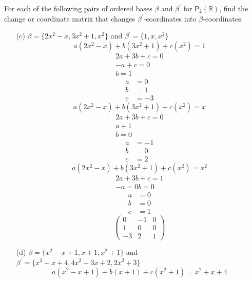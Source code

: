 For each of the following pairs of ordered bases $\beta$ and $\beta^\prime$
for $\mathsf{P}_2(\mathbb{R})$, find the change or coordinate matrix
that changes $\beta^\prime$-coordinates into $\beta$-coordinates.
\begin{enumerate}[(a)]
\item[(c)] $\beta = \{2x^2-x,3x^2+1,x^2\}$ and $\beta^\prime = \{1,x,x^2\}$
\begin{equation}
a(2x^2-x) + b(3x^2 +1) +c(x^2) =1 
\end{equation}
\begin{gather}
2a+3b+c = 0\\
-a +c = 0\\
b = 1
\end{gather}
\begin{align}
a&=0\\
b&=1\\
c&=-3
\end{align}
\begin{equation}
a(2x^2-x) + b(3x^2+1) +c(x^2) = x
\end{equation}
\begin{gather}
2a + 3b +c = 0\\
a +1 \\
b = 0
\end{gather}
\begin{align}
a&=-1\\
b&=0\\
c&=2
\end{align}
\begin{equation}
a(2x^2-x) +b(3x^2+1) +c(x^2) = x^2
\end{equation}
\begin{gather}
2a +3b +c = 1\\
-a = 0
b = 0
\end{gather}
\begin{align}
a&=0\\
b&=0\\
c&=1
\end{align}
\begin{equation}
\begin{pmatrix}
0&-1&0\\
1&0&0\\
-3&2&1
\end{pmatrix}
\end{equation}
\item[(d)] $\beta = \{x^2 -x+1,x+1,x^2+1\}$ 
  and $\beta^\prime = \{x^2 +x+4,4x^2-3x+2,2x^2+3\}$
\begin{equation}
a(x^2-x+1) + b(x+1) + c(x^2 + 1) = x^2 +x +4

\end{equation}
\end{enumerate}
